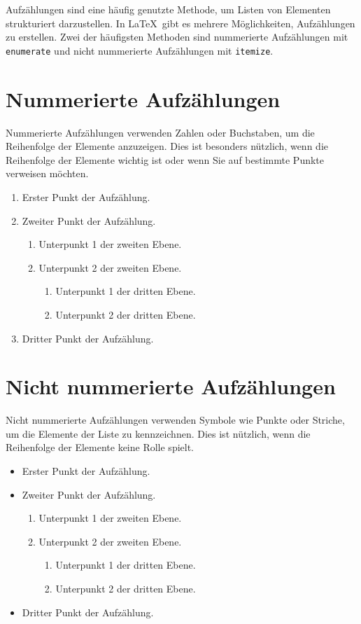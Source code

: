 Aufzählungen sind eine häufig genutzte Methode, um Listen von Elementen
strukturiert darzustellen. In \LaTeX\ gibt es mehrere Möglichkeiten,
Aufzählungen zu erstellen. Zwei der häufigsten Methoden sind nummerierte
Aufzählungen mit \texttt{enumerate} und nicht nummerierte Aufzählungen mit
\texttt{itemize}.

\section{Nummerierte Aufzählungen}

Nummerierte Aufzählungen verwenden Zahlen oder Buchstaben, um die Reihenfolge
der Elemente anzuzeigen. Dies ist besonders nützlich, wenn die Reihenfolge der
Elemente wichtig ist oder wenn Sie auf bestimmte Punkte verweisen möchten.

\begin{enumerate}
  \item Erster Punkt der Aufzählung.
  \item Zweiter Punkt der Aufzählung.
  \begin{enumerate}
      \item Unterpunkt 1 der zweiten Ebene.
      \item Unterpunkt 2 der zweiten Ebene.
      \begin{enumerate}
          \item Unterpunkt 1 der dritten Ebene.
          \item Unterpunkt 2 der dritten Ebene.
      \end{enumerate}
  \end{enumerate}
  \item Dritter Punkt der Aufzählung.
\end{enumerate}

\section{Nicht nummerierte Aufzählungen}

Nicht nummerierte Aufzählungen verwenden Symbole wie Punkte oder Striche, um die
Elemente der Liste zu kennzeichnen. Dies ist nützlich, wenn die Reihenfolge der
Elemente keine Rolle spielt.

\begin{itemize}
  \item Erster Punkt der Aufzählung.
  \item Zweiter Punkt der Aufzählung.
  \begin{enumerate}
      \item Unterpunkt 1 der zweiten Ebene.
      \item Unterpunkt 2 der zweiten Ebene.
      \begin{enumerate}
          \item Unterpunkt 1 der dritten Ebene.
          \item Unterpunkt 2 der dritten Ebene.
      \end{enumerate}
  \end{enumerate}
  \item Dritter Punkt der Aufzählung.
\end{itemize}


